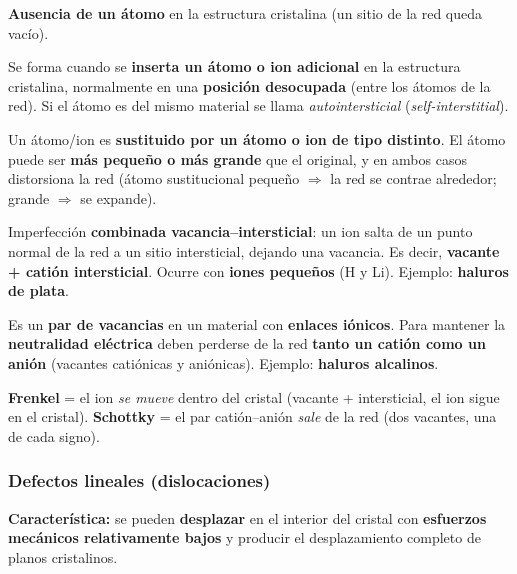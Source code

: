\documentclass[12pt,a4paper]{article}
\begin{document}
\begin{description}[leftmargin=0pt,style=nextline]
	\item[1. Vacante] \textbf{Ausencia de un átomo} en la estructura cristalina
	      (un sitio de la red queda vacío).
	\item[2. Intersticial] Se forma cuando se \textbf{inserta un átomo o ion
		      adicional} en la estructura cristalina, normalmente en una
	      \textbf{posición
		      desocupada} (entre los átomos de la red). Si el átomo es del mismo
	      material se
	      llama \emph{autointersticial} (\emph{self-interstitial}).
	\item[3. Sustitucional (o impurezas en sólidos)] Un átomo/ion es
	      \textbf{sustituido por un átomo o ion de tipo distinto}. El átomo puede
	      ser
	      \textbf{más pequeño o más grande} que el original, y en ambos casos
	      distorsiona
	      la red (átomo sustitucional pequeño $\Rightarrow$ la red se contrae
	      alrededor;
	      grande $\Rightarrow$ se expande).
	\item[4. Defecto Frenkel] Imperfección \textbf{combinada
		      vacancia--intersticial}: un ion salta de un punto normal de la red a
	      un sitio
	      intersticial, dejando una vacancia. Es decir, \textbf{vacante + catión
		      intersticial}. Ocurre con \textbf{iones pequeños} (H y Li). Ejemplo:
	      \textbf{haluros de plata}.
	\item[5. Defecto Schottky] Es un \textbf{par de vacancias} en un material con
	      \textbf{enlaces iónicos}. Para mantener la \textbf{neutralidad
		      eléctrica} deben
	      perderse de la red \textbf{tanto un catión como un anión} (vacantes
	      catiónicas y
	      aniónicas). Ejemplo: \textbf{haluros alcalinos}.
\end{description}

\begin{aviso}
	\textbf{Frenkel} = el ion \emph{se mueve} dentro del cristal (vacante +
	intersticial, el ion sigue en el cristal). \textbf{Schottky} = el par
	catión--anión \emph{sale} de la red (dos vacantes, una de cada signo).
\end{aviso}

\subsubsection{Defectos lineales (dislocaciones)}

\textbf{Característica:} se pueden \textbf{desplazar} en el interior del cristal
con \textbf{esfuerzos mecánicos relativamente bajos} y producir el
desplazamiento completo de planos cristalinos.
\end{document}
